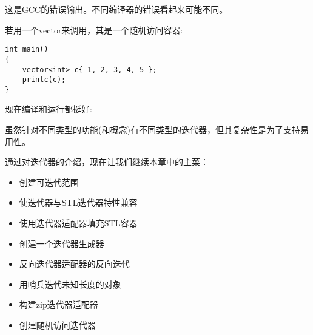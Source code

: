 这是GCC的错误输出。不同编译器的错误看起来可能不同。

若用一个vector来调用，其是一个随机访问容器:

\begin{lstlisting}[style=styleCXX]
int main()
{
	vector<int> c{ 1, 2, 3, 4, 5 };
	printc(c);
}
\end{lstlisting}

现在编译和运行都挺好:


虽然针对不同类型的功能(和概念)有不同类型的迭代器，但其复杂性是为了支持易用性。

通过对迭代器的介绍，现在让我们继续本章中的主菜：

\begin{itemize}
\item 
创建可迭代范围

\item 
使迭代器与STL迭代器特性兼容

\item 
使用迭代器适配器填充STL容器

\item 
创建一个迭代器生成器

\item 
反向迭代器适配器的反向迭代

\item 
用哨兵迭代未知长度的对象

\item 
构建zip迭代器适配器

\item 
创建随机访问迭代器
\end{itemize}


